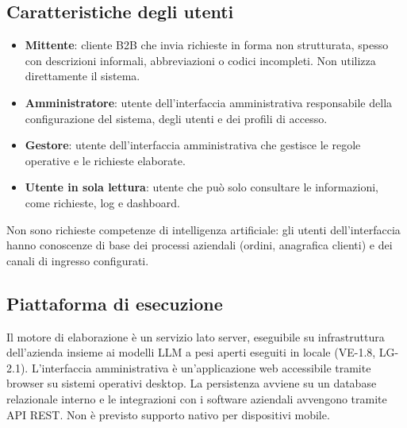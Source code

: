 \subsection{Caratteristiche degli utenti}
	\begin{itemize}
		\item \textbf{Mittente}: cliente B2B che invia richieste in forma non strutturata, spesso con descrizioni informali, abbreviazioni o codici incompleti. Non utilizza direttamente il sistema.
		\item \textbf{Amministratore}: utente dell'interfaccia amministrativa responsabile della configurazione del sistema, degli utenti e dei profili di accesso.
		\item \textbf{Gestore}: utente dell'interfaccia amministrativa che gestisce le regole operative e le richieste elaborate.
		\item \textbf{Utente in sola lettura}: utente che può solo consultare le informazioni, come richieste, log e dashboard.
	\end{itemize}
Non sono richieste competenze di intelligenza artificiale: gli utenti dell'interfaccia hanno conoscenze di base dei processi aziendali (ordini, anagrafica clienti) e dei canali di ingresso configurati.

\subsection{Piattaforma di esecuzione}
Il motore di elaborazione è un servizio lato server, eseguibile su infrastruttura dell'azienda insieme ai modelli LLM a pesi aperti eseguiti in locale (VE-1.8, LG-2.1). L'interfaccia amministrativa è un'applicazione web accessibile tramite browser su sistemi operativi desktop. La persistenza avviene su un database relazionale interno e le integrazioni con i software aziendali avvengono tramite API REST. Non è previsto supporto nativo per dispositivi mobile.


